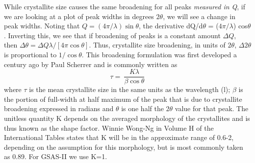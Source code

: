 While crystallite size causes the same broadening for all peaks \textit{measured in Q}, if we are looking at a plot of peak widths in degrees $2\theta$, we will see a change in peak widths. 
Noting that $Q = (4\pi/\lambda) \sin\theta$, the derivative dQ/d$\theta$ = ($4\pi/\lambda$) cos$\theta$. Inverting this, we see that if broadening of peaks is a constant amount $\Delta Q$, then $\Delta\theta = \Delta Q \lambda / [4\pi \cos\theta]$. Thus, crystallite size broadening, in units of $2\theta$, $\Delta 2\theta$ is proportional to $1/\cos\theta$. This broadening formulation was first developed a century ago by Paul Scherrer and is commonly written as 
$$\tau=\ {\frac{K\lambda}{\beta\cos{\theta}}}$$
where $\tau$ is the mean crystallite size in the same units as the wavelength (l); $\beta$ is the portion of full-width at half maximum of the peak that is due to crystallite broadening expressed in radians and $\theta$ is one half the $2\theta$ value for that peak. The unitless quantity K depends on the averaged morphology of the crystallites and is thus known as the shape factor. Winnie Wong-Ng in Volume H of the International Tables states that K will be in the approximate range of 0.6-2, depending on the assumption for this morphology, but is most commonly taken as 0.89. For GSAS-II we use K=1. 

